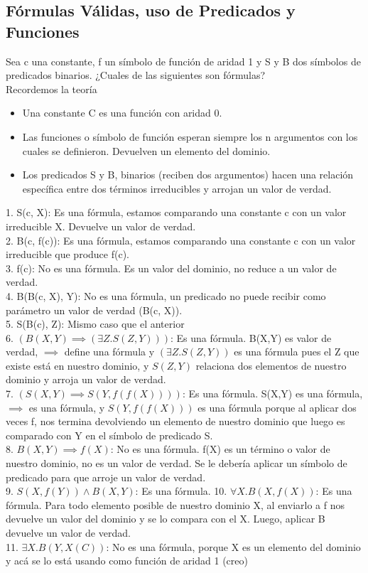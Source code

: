 \documentclass[10pt,a4paper]{article}
\begin{document}
\subsection*{Fórmulas Válidas, uso de Predicados y Funciones}
\label{subsec:lpo_formulas}
Sea c una constante, f un símbolo de función de aridad 1 y S y B dos símbolos de predicados binarios. ¿Cuales de las siguientes son fórmulas? \\
Recordemos la teoría 
\begin{itemize}
    \item Una constante C es una función con aridad 0.
    \item Las funciones o símbolo de función esperan siempre los n argumentos con los cuales se definieron. Devuelven un elemento del dominio.
    \item Los predicados S y B, binarios (reciben dos argumentos) hacen una relación específica entre dos términos irreducibles y arrojan un valor de verdad.
\end{itemize}
1. S(c, X): Es una fórmula, estamos comparando una constante c con un valor irreducible X. Devuelve un valor de verdad. \\
2. B(c, f(c)): Es una fórmula, estamos comparando una constante c con un valor irreducible que produce f(c). \\
3. f(c): No es una fórmula. Es un valor del dominio, no reduce a un valor de verdad. \\
4. B(B(c, X), Y): No es una fórmula, un predicado no puede recibir como parámetro un valor de verdad (B(c, X)). \\
5. S(B(c), Z): Mismo caso que el anterior \\
6. $(B(X,Y) \implies (\exists Z.S(Z,Y)))$: Es una fórmula. B(X,Y) es valor de verdad, $\implies$ define una fórmula y $(\exists Z.S(Z,Y))$ es una fórmula pues el Z que existe está en nuestro dominio, y $S(Z,Y)$ relaciona dos elementos de nuestro dominio y arroja un valor de verdad. \\
7. $(S(X,Y) \implies S(Y, f(f(X))))$: Es una fórmula. S(X,Y) es una fórmula, $\implies$ es una fórmula, y $S(Y, f(f(X)))$ es una fórmula porque al aplicar dos veces f, nos termina devolviendo un elemento de nuestro dominio que luego es comparado con Y en el símbolo de predicado S. \\
8. $B(X,Y) \implies f(X)$: No es una fórmula. f(X) es un término o valor de nuestro dominio, no es un valor de verdad. Se le debería aplicar un símbolo de predicado para que arroje un valor de verdad. \\
9. $S(X, f(Y)) \land B(X,Y)$: Es una fórmula. 
10. $\forall X. B(X, f(X))$: Es una fórmula. Para todo elemento posible de nuestro dominio X, al enviarlo a f nos devuelve un valor del dominio y se lo compara con el X. Luego, aplicar B devuelve un valor de verdad. \\
11. $\exists X. B(Y, X(C))$: No es una fórmula, porque X es un elemento del dominio y acá se lo está usando como función de aridad 1 (creo) 
\end{document}
